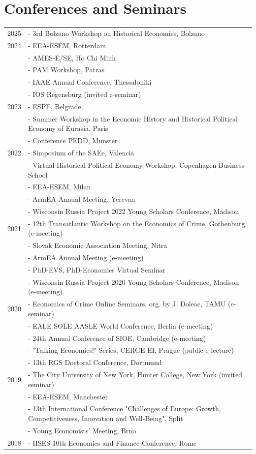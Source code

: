 \documentclass[letterpaper]{article}
\begin{document}
\section*{Conferences and Seminars}
\vspace{-0.5cm}
\noindent {\color{grey} \rule{\linewidth}{0.1mm}}
\begin{tabular}{ p{} p{}  }
2025 & - 3rd Bolzano Workshop on Historical Economics, Bolzano \\
2024 & - EEA-ESEM, Rotterdam \\
& - AMES-E/SE, Ho Chi Minh \\
& - PAM Workshop, Patras \\
& - IAAE Annual Conference, Thessaloniki \\
& - IOS Regensburg (invited e-seminar) \\
2023 & - ESPE, Belgrade \\
& - Summer Workshop in the Economic History and Historical Political Economy of Eurasia, Paris \\
 & - Conference PEDD, Munster \\
2022 & - Simposium of the SAEe, Valencia \\
& - Virtual Historical Political Economy Workshop, Copenhagen Business School \\
 & - EEA-ESEM, Milan\\
 & - ArmEA Annual Meeting, Yerevan \\
 & - Wisconsin Russia Project 2022 Young Scholars Conference, Madison \\
2021 & - 12th Transatlantic Workshop on the Economics of Crime, Gothenburg (e-meeting)\\
 & - Slovak Economic Association Meeting, Nitra\\
 & - ArmEA Annual Meeting (e-meeting) \\
 & - PhD-EVS, PhD-Economics Virtual Seminar\\
 & - Wisconsin Russia Project 2020 Young Scholars Conference, Madison (e-meeting) \\
2020 & - Economics of Crime Online Seminars, org. by J. Doleac, TAMU (e-seminar)\\
 & - EALE SOLE AASLE World Conference, Berlin (e-meeting) \\
 & - 24th Annual Conference of SIOE, Cambridge (e-meeting) \\
 & - "Talking Economics!" Series, CERGE-EI, Prague (public e-lecture) \\
 & - 13th RGS Doctoral Conference, Dortmund \\
2019 & - The City University of New York, Hunter College, New York (invited seminar) \\
& - EEA-ESEM, Manchester \\
& - 13th International Conference "Challenges of Europe: Growth, Competitiveness, Innovation and Well-Being", Split \\
& - Young Economists' Meeting, Brno \\
2018 & - IISES 10th Economics and Finance Conference, Rome
\end{tabular}
\end{document}
